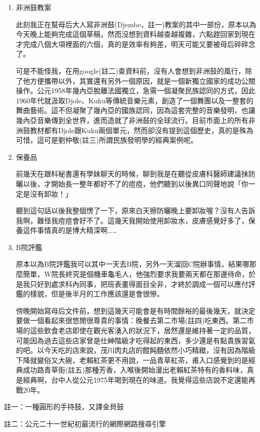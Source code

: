 \documentclass[a5paper, 12pt
]{book}
\begin{document}
\begin{enumerate}
\def\labelenumi{\arabic{enumi}.}
\item
  非洲鼓教案

  此刻我正在幫母后大人寫非洲鼓(Djembe，註一)教案的其中一部份，原本以為今天晚上能夠完成這個草稿，然而沒想到資料越查越複雜，六點趕回家到現在才完成八個大項裡面的六個，真的是效率有夠差，明天可能又要被母后碎碎念了。

  可是不能怪我，在用google(註二)查資料前，沒有人會想到非洲鼓的風行，除了他方便攜帶以外，其實還有另外一個原因，就是一個新獨立國家的成功公關操作。公元1958年幾內亞脫離法國獨立，急需一個凝聚民族認同的方式，因此1960年代就汲取Djole、Kuku等傳統音樂元素，創造了一個舞團以及一整套的舞曲藝術。這不但凝聚了幾內亞的國族認同，因為這套完整的音樂發明，也讓幾內亞音樂傳到全世界，進而造就了非洲鼓的全球流行。目前市面上的所有非洲鼓教材都有Djole跟Kuku兩個單元，然而卻沒有提到這個歷史，真的是殊為可惜，這可是劉仲敬(註三)所謂民族發明學的經典案例呢。
\item
  保養品

  前幾天在跟科秘書還有學妹聊天的時候，聊到我是在聽從皮膚科醫師建議抹防曬以後，才開始長一整年都好不了的痘痘，他們聽到以後異口同聲地說「你一定是沒有卸妝！」

  聽到這句話以後我整個愣了一下，原來白天擦防曬晚上要卸妝喔？沒有人告訴我啊，難怪我痘痘會好不了。這幾天我開始使用卸妝水，皮膚感覺好多了，保養這件事情真的是博大精深啊\ldots\ldots{}
\item
  B院評鑑

  原本以為B院評鑑我可以其中一天去B院，另外一天溜回C院辦事情，結果哪那麼簡單，W院長終究是個機車龜毛人，他強烈要求我要兩天都在那邊待命，於是我只好到處求科內同事，把班表畫得面目全非，才終於調成一個可以應付評鑑的樣貌，但是後半月的工作應該還是會很慘。

  傍晚開始寫母后文件前，想到這幾天可能會是有時間餘裕的最後幾天，就決定要做一個看起來很悠閒很尊貴的事情：晚餐去第二市場(註四)吃東西。第二市場的這些飲食老店即使在觀光客湧入的狀況下，居然還是維持著一定的品質，可能因為過去這些店家曾是仕紳階級才吃得起的東西，多少還是有點貴族習氣的吧。以今天吃的店來說，茂川肉丸店的餛飩麵依然小巧精緻，沒有因為階級下降就變俗又大碗，老賴紅茶更不用說，一品青草紅茶，甫入口感覺到的是經典成功路青草街(註五)那種芳香，入喉後開始漫出老賴紅茶特有的香料味，真是經典啊，台中人從公元1975年喝到現在的味道。我覺得這些店說不定還能再戰20年。
\end{enumerate}

註一：一種圓形的手持鼓，又譯金貝鼓

註二：公元二十一世紀初最流行的網際網路搜尋引擎
\end{document}
